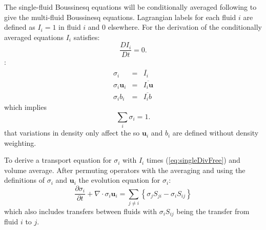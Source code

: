 \documentclass[draft]{agujournal2019}
\begin{document}
The single-fluid Boussinesq equations will be conditionally averaged following  to give the multi-fluid Boussinesq equations. Lagrangian labels for each fluid $i$ are defined as $I_i=1$ in fluid $i$ and 0 elsewhere. 
For the derivation of the conditionally averaged equations   $I_i$ satisfies:
\begin{equation}
\frac{DI_i}{Dt}=0.
\label{eq:LagrangianLabel}
\end{equation}
:
\begin{eqnarray}
\sigma_i &=& \overline{I_i} \\
\sigma_i \mathbf{u}_i &=& \overline{I_i \mathbf{u}} \\
\sigma_i b_i &=& \overline{I_i b}
\label{eq:defineFluidFields}
\end{eqnarray}
which implies
\begin{equation}
\sum_{i}\sigma_{i}  =  1.
\label{eq:sumOne}
\end{equation}
 that variations in density only affect the  so $\mathbf{u}_i$ and $b_i$ are defined without density weighting. 

To derive a transport equation for $\sigma_i$ with $I_i$ times (\ref{eq:singleDivFree}) and volume average. After permuting operators with the averaging \cite<as described by>{TWV+18}\add[WM]{,} and using the definitions of $\sigma_i$ and $\mathbf{u}_i$\add[WM]{,}  the evolution equation for $\sigma_i$:
\begin{equation}
\frac{\partial\sigma_{i}}{\partial t}+\nabla\cdot\sigma_{i}\mathbf{u}_{i}  =  \sum_{j\ne i}\left\{ \sigma_{j}S_{ji}-\sigma_{i}S_{ij}\right\}
\label{eq:sigma}
\end{equation}
which also includes transfers between fluids with $\sigma_{i}S_{ij}$ being the transfer from fluid $i$ to $j$.
\end{document}
